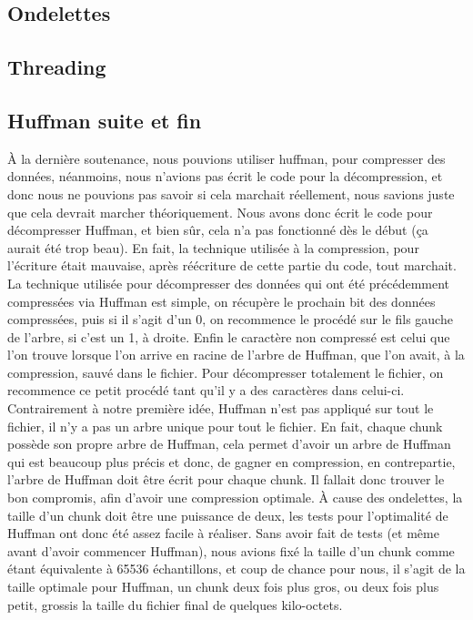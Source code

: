 \documentclass[a4paper,12pt]{article}
\begin{document}
	\subsection{Ondelettes}
	\subsection{Threading}
	\subsection{Huffman suite et fin}
À la dernière soutenance, nous pouvions utiliser huffman, pour compresser des
données, néanmoins, nous n'avions pas écrit le code pour la décompression, et
donc nous ne pouvions pas savoir si cela marchait réellement, nous savions juste
que cela devrait marcher théoriquement. Nous avons donc écrit le code pour
décompresser Huffman, et bien sûr, cela n'a pas fonctionné dès le début (ça
aurait été trop beau). En fait, la technique utilisée à la compression, pour
l'écriture était mauvaise, après réécriture de cette partie du code, tout
marchait.\\
La technique utilisée pour décompresser des données qui ont été précédemment
compressées via Huffman est simple, on récupère le prochain bit des données
compressées, puis si il s'agit d'un 0, on recommence le procédé sur le fils
gauche de l'arbre, si c'est un 1, à droite. Enfin le caractère non compressé est
celui que l'on trouve lorsque l'on arrive en racine de l'arbre de Huffman, que
l'on avait, à la compression, sauvé dans le fichier. Pour décompresser
totalement le fichier, on recommence ce petit
procédé tant qu'il y a des caractères dans celui-ci.\\
Contrairement à notre première idée, Huffman n'est pas appliqué sur tout le
fichier, il n'y a pas un arbre unique pour tout le fichier. En fait, chaque
chunk possède son propre arbre de Huffman, cela permet d'avoir un arbre de
Huffman qui est beaucoup plus précis et donc, de gagner en compression, en
contrepartie, l'arbre de
Huffman doit être écrit pour chaque chunk. Il fallait donc trouver le bon
compromis, afin d'avoir une compression optimale. À cause des ondelettes, la
taille d'un chunk doit être une puissance de deux, les tests pour l'optimalité
de Huffman ont donc été assez facile à réaliser. Sans avoir fait de tests (et
même avant d'avoir commencer Huffman), nous avions fixé la taille d'un chunk
comme étant équivalente à 65536 échantillons, et coup de chance pour nous, il
s'agit de la taille optimale pour Huffman, un chunk deux fois plus gros, ou deux
fois plus petit, grossis la taille du fichier final de quelques
kilo-octets.\\
\end{document}
